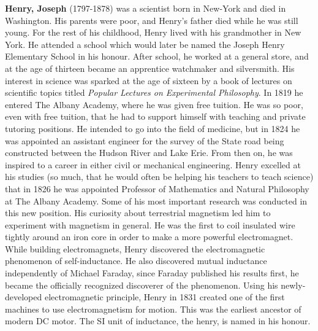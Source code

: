 \textbf{Henry, Joseph} (1797-1878) was a scientist born in New-York and died in Washington. His parents were poor, and Henry's father died while he was still young. For the rest of his childhood, Henry lived with his grandmother in New York. He attended a school which would later be named the Joseph Henry Elementary School in his honour. After school, he worked at a general store, and at the age of thirteen became an apprentice watchmaker and silversmith. His interest in science was sparked at the age of sixteen by a book of lectures on scientific topics titled \textit{Popular Lectures on Experimental Philosophy}. In 1819 he entered The Albany Academy, where he was given free tuition. He was so poor, even with free tuition, that he had to support himself with teaching and private tutoring positions. He intended to go into the field of medicine, but in 1824 he was appointed an assistant engineer for the survey of the State road being constructed between the Hudson River and Lake Erie. From then on, he was inspired to a career in either civil or mechanical engineering. Henry excelled at his studies (so much, that he would often be helping his teachers to teach science) that in 1826 he was appointed Professor of Mathematics and Natural Philosophy at The Albany Academy. Some of his most important research was conducted in this new position. His curiosity about terrestrial magnetism led him to experiment with magnetism in general. He was the first to coil insulated wire tightly around an iron core in order to make a more powerful electromagnet. While building electromagnets, Henry discovered the electromagnetic phenomenon of self-inductance. He also discovered mutual inductance independently of Michael Faraday, since Faraday published his results first, he became the officially recognized discoverer of the phenomenon. Using his newly-developed electromagnetic principle, Henry in 1831 created one of the first machines to use electromagnetism for motion. This was the earliest ancestor of modern DC motor. The SI unit of inductance, the henry, is named in his honour.


